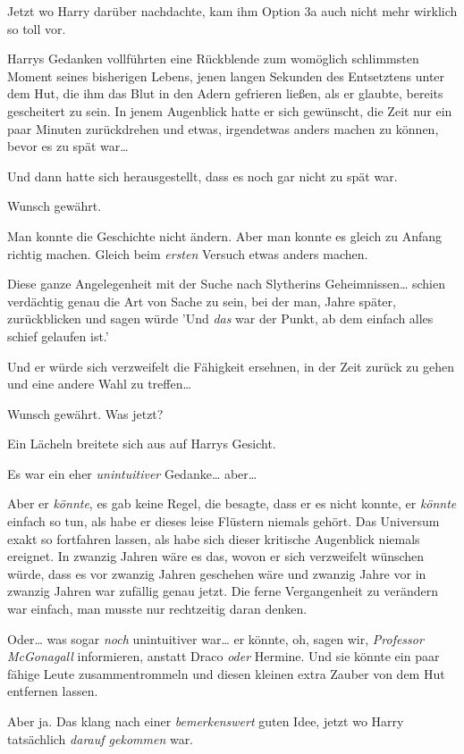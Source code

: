 {Jetzt wo Harry darüber nachdachte, kam ihm Option 3a auch nicht mehr wirklich so toll vor.

Harrys Gedanken vollführten eine Rückblende zum womöglich schlimmsten Moment seines bisherigen Lebens, jenen langen Sekunden des Entsetztens unter dem Hut, die ihm das Blut in den Adern gefrieren ließen, als er glaubte, bereits gescheitert zu sein. In jenem Augenblick hatte er sich gewünscht, die Zeit nur ein paar Minuten zurückdrehen und etwas, irgendetwas anders machen zu können, bevor es zu spät war…

Und dann hatte sich herausgestellt, dass es noch gar nicht zu spät war.

Wunsch gewährt.

Man konnte die Geschichte nicht ändern. Aber man konnte es gleich zu Anfang richtig machen. Gleich beim \emph{ersten} Versuch etwas anders machen.

Diese ganze Angelegenheit mit der Suche nach Slytherins Geheimnissen… schien verdächtig genau die Art von Sache zu sein, bei der man, Jahre später, zurückblicken und sagen würde 'Und \emph{das} war der Punkt, ab dem einfach alles schief gelaufen ist.'

Und er würde sich verzweifelt die Fähigkeit ersehnen, in der Zeit zurück zu gehen und eine andere Wahl zu treffen…

Wunsch gewährt. Was jetzt?

Ein Lächeln breitete sich aus auf Harrys Gesicht.

Es war ein eher \emph{unintuitiver} Gedanke… aber…

Aber er \emph{könnte}, es gab keine Regel, die besagte, dass er es nicht konnte, er \emph{könnte} einfach so tun, als habe er dieses leise Flüstern niemals gehört. Das Universum exakt so fortfahren lassen, als habe sich dieser kritische Augenblick niemals ereignet. In zwanzig Jahren wäre es das, wovon er sich verzweifelt wünschen würde, dass es vor zwanzig Jahren geschehen wäre und zwanzig Jahre vor in zwanzig Jahren war zufällig genau jetzt. Die ferne Vergangenheit zu verändern war einfach, man musste nur rechtzeitig daran denken.

Oder… was sogar \emph{noch} unintuitiver war… er könnte, oh, sagen wir, \emph{Professor McGonagall} informieren, anstatt Draco \emph{oder} Hermine. Und sie könnte ein paar fähige Leute zusammentrommeln und diesen kleinen extra Zauber von dem Hut entfernen lassen.

Aber ja. Das klang nach einer \emph{bemerkenswert} guten Idee, jetzt wo Harry tatsächlich \emph{darauf gekommen} war.

}
